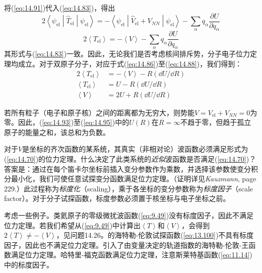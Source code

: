     将(\ref{eq:14.91})代入(\ref{eq:14.83})，得出
    \begin{equation*}
        2 \left\langle \psi_{\text{el}} \middle| \hat{T}_{\text{el}} \middle| \psi_{\text{el}} \right\rangle = - \left\langle \psi_{\text{el}} \middle| \hat{V}_{\text{el}} + V_{NN} \middle| \psi_{\text{el}} \right\rangle - \sum_{\alpha} q_{\alpha} \frac{\partial U}{\partial q_{\alpha}}
    \end{equation*}
    \begin{equation}
        2 \left\langle T_{\text{el}} \right\rangle = - \left\langle V \right\rangle - \sum_{\alpha} q_{\alpha} \frac{\partial U}{\partial q_{\alpha}}
        \label{eq:14.92}
    \end{equation}
    其形式与(\ref{eq:14.83})一致。因此，无论我们是否考虑核间排斥势，分子电子位力定理均成立。对于双原子分子，对应于式(\ref{eq:14.86})至(\ref{eq:14.88})，我们得到：
    \begin{align}
        2 \left\langle T_{\text{el}} \right\rangle &= - \left\langle V \right\rangle - R \left(\dd U / \dd R\right) \label{eq:14.93} \\
        \left\langle T_{\text{el}} \right\rangle &= U - R \left(\dd U / \dd R\right) \label{eq:14.94} \\
        \left\langle V \right\rangle &= 2U + R \left(\dd U / \dd R\right) \label{eq:14.95}
    \end{align}

    若所有粒子（电子和原子核）之间的距离都为无穷大，则势能$V = V_{\text{el}} + V_{NN} = 0$为零。因此，(\ref{eq:14.93})至(\ref{eq:14.95})中的$U\left(R\right)$在$R = \infty$不趋于零，但趋于孤立原子的能量之和，该总和为负数。

    对于$V$是坐标的齐次函数的某系统，其真实（非相对论）波函数必须满足形式为(\ref{eq:14.70})的位力定理。什么决定了此类系统的\textit{近似}波函数是否满足(\ref{eq:14.70})？答案是：通过在每个笛卡尔坐标前插入变分参数作为乘数，并选择该参数使变分积分最小化，我们可使任意试探变分函数满足位力定理。（证明详见\textit{Kauzmann}, page 229.）此过程称为\textit{标度化}（scaling），乘于各坐标的变分参数称为\textit{标度因子}（scale factor）。对于分子试探函数，标度参数必须置于核坐标与电子坐标之前。

    考虑一些例子。类氦原子的零级微扰波函数(\ref{eq:9.49})没有标度因子，因此不满足位力定理。若我们希望从(\ref{eq:9.49})中计算出$\left\langle T \right\rangle$和$\left\langle V \right\rangle$，会得到$2 \left\langle T \right\rangle \neq - \left\langle V \right\rangle$，见问题14.26。的海特勒-伦敦试探函数(\ref{eq:13.100})不具有标度因子，因此也不满足位力定理。引入了由变量决定的轨道指数的海特勒-伦敦-王函数满足位力定理。哈特里-福克函数满足位力定理，注意斯莱特基函数(\ref{eq:11.14})中的标度因子。


